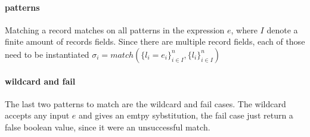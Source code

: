 \documentclass[../../master.tex]{subfiles}
\begin{document}
\paragraph{patterns}
Matching a record matches on all patterns in the expression $e$, where $I$ denote a finite amount of records fields.
Since there are multiple record fields, each of those need to be instantiated
$\sigma_i=match(\{l_i=e_i\}^n_{i \in I},\{l_i\}^n_{i \in I})$

\paragraph{wildcard and fail}
The last two patterns to match are the wildcard and fail cases.
The wildcard accepts any input $e$ and gives an emtpy sybstitution, the fail case just return a false boolean value, since it were an unsuccessful match.

\end{document}
